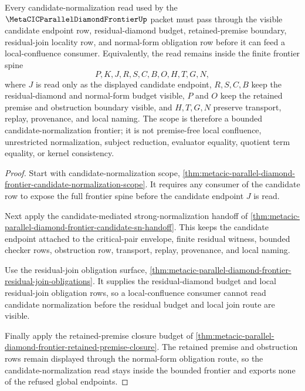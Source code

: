 \begin{theorem}
\label{thm:metacic-parallel-diamond-candidate-normalization-frontier-scope}
Every candidate-normalization read used by the $\MetaCICParallelDiamondFrontierUp$ packet must pass through the visible candidate endpoint row, residual-diamond budget, retained-premise boundary, residual-join locality row, and normal-form obligation row before it can feed a local-confluence consumer. Equivalently, the read remains inside the finite frontier spine
$$
P,K,J,R,S,C,B,O,H,T,G,N ,
$$
where $J$ is read only as the displayed candidate endpoint, $R,S,C,B$ keep the residual-diamond and normal-form budget visible, $P$ and $O$ keep the retained premise and obstruction boundary visible, and $H,T,G,N$ preserve transport, replay, provenance, and local naming. The scope is therefore a bounded candidate-normalization frontier; it is not premise-free local confluence, unrestricted normalization, subject reduction, evaluator equality, quotient term equality, or kernel consistency.
\end{theorem}
\begin{proof}
Start with candidate-normalization scope, \autoref{thm:metacic-parallel-diamond-frontier-candidate-normalization-scope}. It requires any consumer of the candidate row to expose the full frontier spine before the candidate endpoint $J$ is read.

Next apply the candidate-mediated strong-normalization handoff of \autoref{thm:metacic-parallel-diamond-frontier-candidate-sn-handoff}. This keeps the candidate endpoint attached to the critical-pair envelope, finite residual witness, bounded checker rows, obstruction row, transport, replay, provenance, and local naming.

Use the residual-join obligation surface, \autoref{thm:metacic-parallel-diamond-frontier-residual-join-obligations}. It supplies the residual-diamond budget and local residual-join obligation rows, so a local-confluence consumer cannot read candidate normalization before the residual budget and local join route are visible.

Finally apply the retained-premise closure budget of \autoref{thm:metacic-parallel-diamond-frontier-retained-premise-closure}. The retained premise and obstruction rows remain displayed through the normal-form obligation route, so the candidate-normalization read stays inside the bounded frontier and exports none of the refused global endpoints.
\end{proof}
